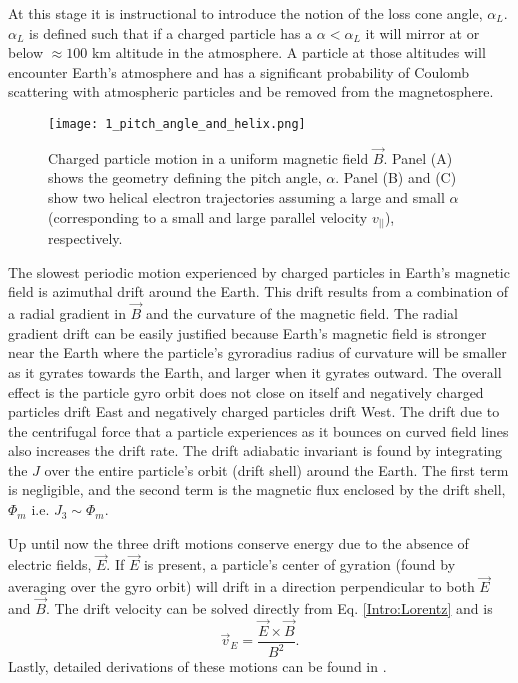 At this stage it is instructional to introduce the notion of the loss cone angle, $\alpha_L$. $\alpha_L$ is defined such that if a charged particle has a $\alpha < \alpha_L$ it will mirror at or below $\approx 100$ km altitude in the atmosphere. A particle at those altitudes will encounter Earth's atmosphere and has a significant probability of Coulomb scattering with atmospheric particles and be removed from the magnetosphere.

\begin{figure}
\texttt{[image: 1\_pitch\_angle\_and\_helix.png]}
\caption{Charged particle motion in a uniform magnetic field $\vec{B}$. Panel (A) shows the geometry defining the pitch angle, $\alpha$. Panel (B) and (C) show two helical electron trajectories assuming a large and small $\alpha$ (corresponding to a small and large parallel velocity $v_{||}$), respectively.}
\label{Intro:pa}
\end{figure}

The slowest periodic motion experienced by charged particles in Earth's magnetic field is azimuthal drift around the Earth. This drift results from a combination of a radial gradient in $\vec{B}$ and the curvature of the magnetic field. The radial gradient drift can be easily justified because Earth's magnetic field is stronger near the Earth where the particle's gyroradius radius of curvature will be smaller as it gyrates towards the Earth, and larger when it gyrates outward. The overall effect is the particle gyro orbit does not close on itself and negatively charged particles drift East and negatively charged particles drift West. The drift due to the centrifugal force that a particle experiences as it bounces on curved field lines also increases the drift rate. The drift adiabatic invariant is found by integrating the $J$ over the entire particle's orbit (drift shell) around the Earth. The first term is negligible, and the second term is the magnetic flux enclosed by the drift shell, $\Phi_m$  i.e. $J_3 \sim \Phi_m$. 

Up until now the three drift motions conserve energy due to the absence of  electric fields, $\vec{E}$. If $\vec{E}$ is present, a particle's center of gyration (found by averaging over the gyro orbit) will drift in a direction perpendicular to both $\vec{E}$ and $\vec{B}$. The drift velocity can be solved directly from Eq. \ref{Intro:Lorentz} and is
\begin{equation}
\vec{v}_E = \frac{\vec{E} \times \vec{B}}{B^2}.
\end{equation} Lastly, detailed derivations of these motions can be found in \citep{Baumjohann1997, Schulz1974, Tsurutani1997}.
        

